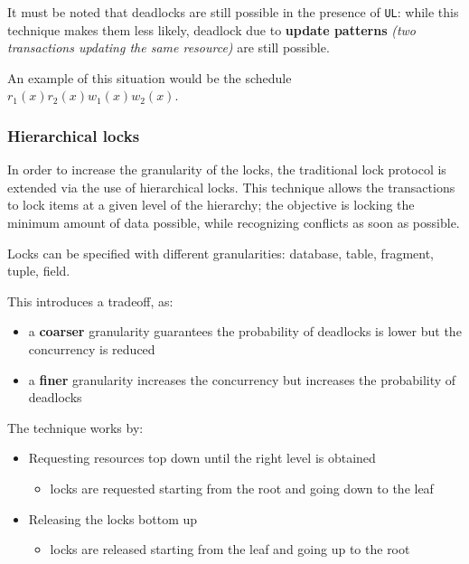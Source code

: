 \documentclass[english]{article}
\begin{document}
\bigskip
It must be noted that deadlocks are still possible in the presence of \texttt{UL}:
while this technique makes them less likely, deadlock due to \textbf{update patterns} \textit{(two transactions updating the same resource)} are still possible.

An example of this situation would be the schedule \(r_1(x) r_2(x) w_1(x) w_2(x)\).

\subsubsection{Hierarchical locks}

In order to increase the granularity of the locks, the traditional lock protocol is extended via the use of hierarchical locks.
This technique allows the transactions to lock items at a given level of the hierarchy;
the objective is locking the minimum amount of data possible, while recognizing conflicts as soon as possible.

\begin{minipage}{0.8\textwidth}
  \bigskip
  Locks can be specified with different granularities: database, table, fragment, tuple, field.

  This introduces a tradeoff, as:
  \begin{itemize}
    \item a \textbf{coarser} granularity guarantees the probability of deadlocks is lower but the concurrency is reduced
    \item a \textbf{finer} granularity increases the concurrency but increases the probability of deadlocks
  \end{itemize}
  \bigskip
\end{minipage}
\begin{minipage}{0.195\textwidth}
  \bigskip
  \centering
  \bigskip
\end{minipage}

\bigskip
The technique works by:

\begin{itemize}
  \item Requesting resources top down until the right level is obtained
        \begin{itemize}[label=\(\downarrow\)]
          \item locks are requested starting from the root and going down to the leaf
        \end{itemize}
  \item Releasing the locks bottom up
        \begin{itemize}[label=\(\uparrow\)]
          \item locks are released starting from the leaf and going up to the root
        \end{itemize}
\end{itemize}
\end{document}
